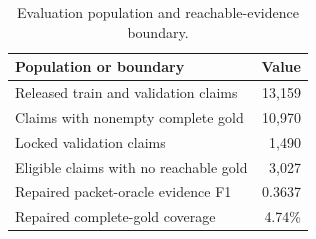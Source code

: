 \begin{table}[t]
\centering
\caption{Evaluation population and reachable-evidence boundary.}
\label{tab:population-flow}
\begin{tabular}{lr}
\toprule
Population or boundary & Value \\
\midrule
Released train and validation claims & 13,159 \\
Claims with nonempty complete gold & 10,970 \\
Locked validation claims & 1,490 \\
Eligible claims with no reachable gold & 3,027 \\
Repaired packet-oracle evidence F1 & 0.3637 \\
Repaired complete-gold coverage & 4.74\% \\
\bottomrule
\end{tabular}
\end{table}
